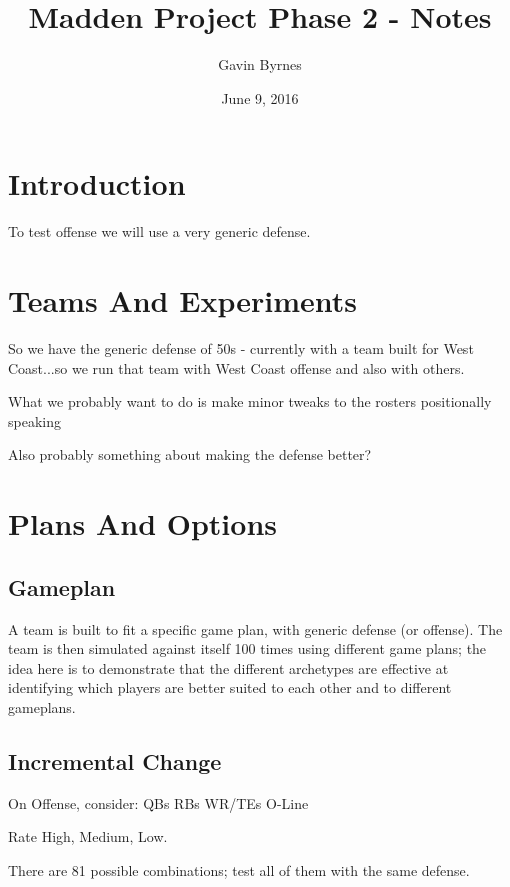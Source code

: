 \documentclass[11pt]{article}
\title{Madden Project Phase 2 - Notes}
\author{Gavin Byrnes}
\date{June 9, 2016}
\begin{document}
\maketitle

\tableofcontents

\begin{abstract}

\end{abstract}

\section{Introduction}

To test offense we will use a very generic defense.

\section{Teams And Experiments}

So we have the generic defense of 50s - currently with a team built for West Coast...so we run that team with West Coast offense and also with others.

What we probably want to do is make minor tweaks to the rosters positionally speaking

Also probably something about making the defense better?

\section{Plans And Options}

\subsection{Gameplan}

A team is built to fit a specific game plan, with generic defense (or offense). The team is then simulated against itself 100 times using different game plans; the idea here is to demonstrate that the different archetypes are effective at identifying which players are better suited to each other and to different gameplans.
\subsection{Incremental Change}
On Offense, consider: 
QBs
RBs
WR/TEs
O-Line

Rate High, Medium, Low.

There are 81 possible combinations; test all of them with the same defense.
\end{document}
